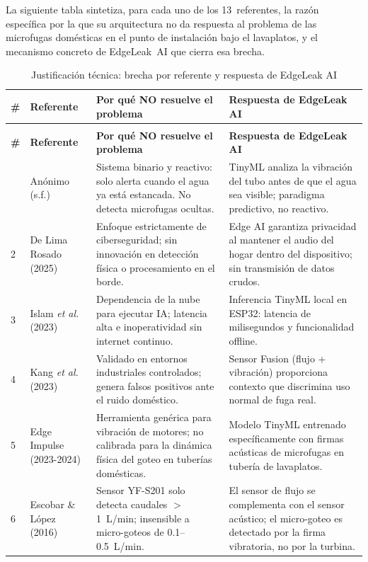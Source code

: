 \documentclass[12pt,a4paper]{article}
\begin{document}
La siguiente tabla sintetiza, para cada uno de los 13~referentes, la razón específica
por la que su arquitectura no da respuesta al problema de las microfugas domésticas en
el punto de instalación bajo el lavaplatos, y el mecanismo concreto de EdgeLeak~AI que
cierra esa brecha.

\begin{longtable}{>{\small}p{0.4cm} >{\small}p{3.4cm} >{\small}p{5.0cm} >{\small}p{5.2cm}}
\caption{Justificación técnica: brecha por referente y respuesta de EdgeLeak AI} \label{tab:justificacion} \\
\toprule
\textbf{\#} & \textbf{Referente} & \textbf{Por qué NO resuelve el problema} & \textbf{Respuesta de EdgeLeak AI} \\
\midrule
\endfirsthead
\multicolumn{4}{c}{\small\textit{(continúa en la siguiente página)}} \\
\toprule
\textbf{\#} & \textbf{Referente} & \textbf{Por qué NO resuelve el problema} & \textbf{Respuesta de EdgeLeak AI} \\
\midrule
\endhead
\bottomrule
\endlastfoot
1 & Anónimo (s.f.) & Sistema binario y reactivo: solo alerta cuando el agua ya está estancada. No detecta microfugas ocultas. & TinyML analiza la vibración del tubo antes de que el agua sea visible; paradigma predictivo, no reactivo. \\[0.4em]
2 & De Lima Rosado (2025) & Enfoque estrictamente de ciberseguridad; sin innovación en detección física o procesamiento en el borde. & Edge AI garantiza privacidad al mantener el audio del hogar dentro del dispositivo; sin transmisión de datos crudos. \\[0.4em]
3 & Islam \textit{et al.} (2023) & Dependencia de la nube para ejecutar IA; latencia alta e inoperatividad sin internet continuo. & Inferencia TinyML local en ESP32: latencia de milisegundos y funcionalidad offline. \\[0.4em]
4 & Kang \textit{et al.} (2023) & Validado en entornos industriales controlados; genera falsos positivos ante el ruido doméstico. & Sensor Fusion (flujo + vibración) proporciona contexto que discrimina uso normal de fuga real. \\[0.4em]
5 & Edge Impulse (2023-2024) & Herramienta genérica para vibración de motores; no calibrada para la dinámica física del goteo en tuberías domésticas. & Modelo TinyML entrenado específicamente con firmas acústicas de microfugas en tubería de lavaplatos. \\[0.4em]
6 & Escobar \& López (2016) & Sensor YF-S201 solo detecta caudales $>$1~L/min; insensible a micro-goteos de 0.1--0.5~L/min. & El sensor de flujo se complementa con el sensor acústico; el micro-goteo es detectado por la firma vibratoria, no por la turbina. \\[0.4em]

\end{longtable}
\end{document}
